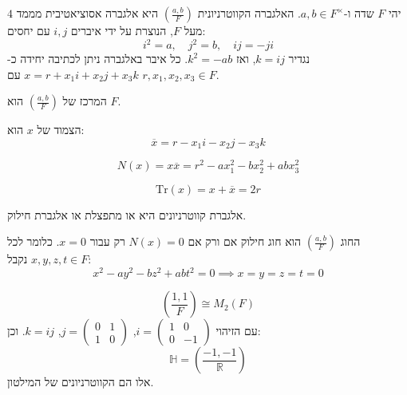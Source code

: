 \documentclass{tstextbook}
\begin{document}
\begin{definition}
יהי \(F\) שדה ו-\(a, b \in F^{\times}\). האלגברה הקווטרניונית \(\left( \frac{a,b}{F} \right)\) היא אלגברה אסוציאטיבית מממד \(4\) מעל \(F\), הנוצרת על ידי איברים \(i, j\) עם יחסים:
$$i^2 = a, \quad j^2 = b, \quad ij = -ji$$
נגדיר \(k = ij\), ואז \(k^2 = -ab\). כל איבר באלגברה ניתן לכתיבה יחידה כ-\(x = r + x_1 i + x_2 j + x_3 k\) עם \(r, x_1, x_2, x_3 \in F\).

\end{definition}
\begin{proposition}
המרכז של \(\left( \frac{a,b}{F} \right)\) הוא \(F\).

\end{proposition}
\begin{definition}[צמוד]
הצמוד של \(x\) הוא:
$$\overline{x} = r - x_1 i - x_2 j - x_3 k$$

\end{definition}
\begin{definition}[נורמה]
$$N(x) = x \overline{x} = r^2 - a x_1^2 - b x_2^2 + ab x_3^2$$

\end{definition}
\begin{definition}[עקבה]
$$\mathrm{Tr}(x) = x + \overline{x} = 2r$$

\end{definition}
\begin{proposition}
אלגברת קווטרניונים היא או מתפצלת או אלגברת חילוק.

\end{proposition}
\begin{proposition}
החוג \(\left( \frac{a,b}{F} \right)\) הוא חוג חילוק אם ורק אם \(N(x) = 0\) רק עבור \(x = 0\). כלומר לכל \(x,y,z,t \in F\) נקבל:
$$x^{2}-a y^{2}-b z^{2}+a b t^{2}=0\implies x=y=z=t=0$$

\end{proposition}
\begin{example}
$$\left( \frac{1,1}{F} \right) \cong M_{2}(F)$$
עם הזיהוי \(i = \begin{pmatrix} 1 & 0 \\ 0 & -1 \end{pmatrix}\), \(j = \begin{pmatrix} 0 & 1 \\ 1 & 0 \end{pmatrix}\), \(k = ij\). וכן:
$$\mathbb{H} = \left( \frac{-1,-1}{\mathbb{R}} \right)$$
אלו הם הקווטרניונים של המילטון.

\end{example}
\end{document}
